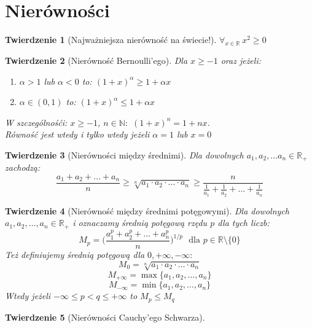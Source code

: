 \documentclass[10pt,a4paper]{article}
\theoremstyle{plain}
\newtheorem{thm}{Twierdzenie}[section]
\theoremstyle{definition}
\theoremstyle{remark}
\newcommand{\N}{\mathbb{N}}
\newcommand{\R}{\mathbb{R}}
\begin{document}
	\section{Nierówności}
	\begin{thm}[Najważniejsza nierówność na świecie!] $\forall_{x\in \R} ~ x^2\geq 0$ \end{thm}
	\begin{thm}[Nierówność Bernoulli'ego]
		Dla $x\geq -1$ oraz jeżeli:
		\begin{enumerate}
			\item $\alpha>1$ lub $\alpha<0$ to: $(1+x)^{\alpha}\geq 1+\alpha x$
			\item $\alpha \in (0,1)$ to: $(1+x)^{\alpha}\leq 1+\alpha x$
		\end{enumerate}
		W szczególnośći: $x \geq -1$, $n \in \N:$ $(1+x)^n=1+nx$. 
		\\ Równość jest wtedy i tylko wtedy jeżeli $\alpha=1$ lub $x=0$
	\end{thm}
	\begin{thm}[Nierówności między średnimi] Dla dowolnych $a_1,a_2,\ldots a_n \in \R_{+}$ zachodzą:
	$$\frac{a_1+a_2+\ldots+a_n}{n}\geq \sqrt[n]{a_1\cdot a_2 \cdot \ldots \cdot a_n}\geq \frac{n}{\frac{1}{a_1}+\frac{1}{a_2}+\ldots+\frac{1}{a_n}}$$
	\end{thm}
	\begin{thm}[Nierówność między średnimi potęgowymi] Dla dowolnych $a_1,a_2,\ldots,a_n \in \R_{+}$ i oznaczamy średnią potęgową rzędu $p$ dla tych liczb: $$M_p=\Big(\frac{a_1^p+a_2^p+\ldots+a_n^p}{n}\Big)^{1/p} ~~~ \textrm{dla } p\in \R\setminus \{0\}$$
	Też definiujemy średnią potęgową dla $0, +\infty,-\infty:$
	$$M_0=\sqrt[n]{a_1 \cdot a_2 \cdot \ldots \cdot a_n}$$
	$$M_{+\infty}=\max\{a_1,a_2,\ldots,a_n\}$$
	$$M_{-\infty}=\min\{a_1,a_2,\ldots,a_n\}$$
	Wtedy jeżeli $-\infty \leq p<q \leq +\infty$ to $M_p \leq M_q$
	\end{thm}
	\begin{thm}[Nierówności Cauchy'ego Schwarza]
		
	\end{thm}
\end{document}
